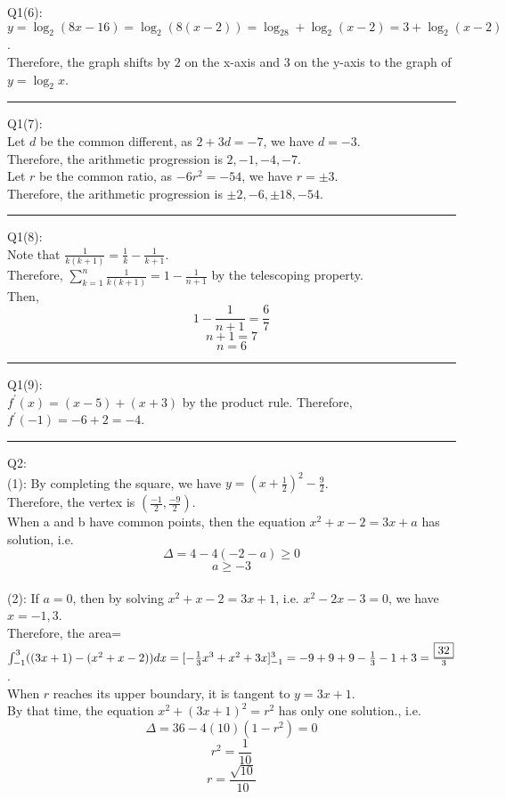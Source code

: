 \documentclass{article}
\begin{document}
\noindent Q1(6):\\
$y=\log_2(8x-16)=\log_2(8(x-2))=\log_28+\log_2(x-2)=3+\log_2(x-2)$.\\
Therefore, the graph shifts by $\boxed2$ on the x-axis and $\boxed3$ on the y-axis to the graph of $y=\log_2x$.

\vspace{1cm}
\hrule
\vspace{1cm}

\noindent Q1(7):\\
Let $d$ be the common different, as $2+3d=-7$, we have $d=-3$.\\
 Therefore, the arithmetic progression is $2,\boxed{-1},\boxed{-4},-7$.\\
Let $r$ be the common ratio, as $-6r^2=-54$, we have $r=\pm3$.\\
Therefore, the arithmetic progression is $\boxed{\pm2}, -6, \boxed{\pm 18}, -54$.

\vspace{1cm}
\hrule
\vspace{1cm}

\noindent Q1(8):\\
Note that $\frac{1}{k(k+1)}=\frac{1}{k}-\frac{1}{k+1}$.\\
Therefore, $\sum\limits_{k=1}^n\frac{1}{k(k+1)}=1-\frac{1}{n+1}$ by the telescoping property.\\
Then, $$1-\frac{1}{n+1}=\frac{6}{7}$$
$$n+1=7$$
$$n=\boxed6$$

\vspace{1cm}
\hrule
\vspace{1cm}

\noindent Q1(9):\\
$f^\prime(x)=(x-5)+(x+3)$ by the product rule. Therefore, $f^\prime(-1)=-6+2=\boxed{-4}$.

\vspace{1cm}
\hrule
\vspace{1cm}

\noindent Q2:\\
(1): By completing the square, we have $y=(x+\frac{1}{2})^2-\frac{9}{2}$.\\
Therefore, the vertex is $(\frac{\boxed{-1}}{2},\frac{\boxed{-9}}{2})$.\\
When a and b have common points, then the equation $x^2+x-2=3x+a$ has solution, i.e.
$$\Delta=4-4(-2-a)\geq0$$
$$a\geq\boxed{-3}$$
\\
(2): If $a=0$, then by solving $x^2+x-2=3x+1$, i.e. $x^2-2x-3=0$, we have $x=\boxed{-1},\boxed3$.\\
Therefore, the area=$\int_{-1}^3((3x+1)-(x^2+x-2))dx\\
=[-\frac{1}{3}x^3+x^2+3x]_{-1}^3\\
=-9+9+9-\frac{1}{3}-1+3\\
=\frac{\boxed{32}}{3}$.\\
When $r$ reaches its upper boundary, it is tangent to $y=3x+1$.\\
By that time, the equation $x^2+(3x+1)^2=r^2$ has only one solution., i.e.
$$\Delta=36-4(10)(1-r^2)=0$$
$$r^2=\frac{1}{10}$$
$$r=\frac{\boxed{\sqrt{10}}}{10}$$
\end{document}
